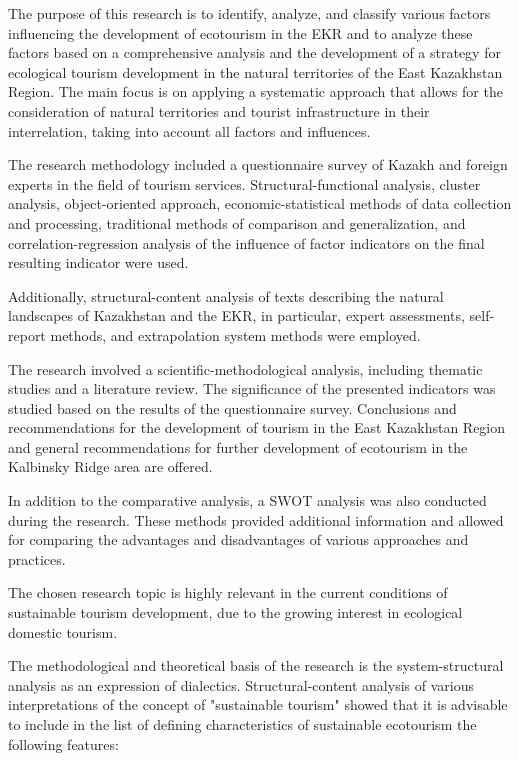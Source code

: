 \begin{multicols}{2}
The purpose of this research is to identify, analyze, and classify
various factors influencing the development of ecotourism in the EKR and
to analyze these factors based on a comprehensive analysis and the
development of a strategy for ecological tourism development in the
natural territories of the East Kazakhstan Region. The main focus is on
applying a systematic approach that allows for the consideration of
natural territories and tourist infrastructure in their interrelation,
taking into account all factors and influences.

The research methodology included a questionnaire survey of Kazakh and
foreign experts in the field of tourism services. Structural-functional
analysis, cluster analysis, object-oriented approach,
economic-statistical methods of data collection and processing,
traditional methods of comparison and generalization, and
correlation-regression analysis of the influence of factor indicators on
the final resulting indicator were used.

Additionally, structural-content analysis of texts describing the
natural landscapes of Kazakhstan and the EKR, in particular, expert
assessments, self-report methods, and extrapolation system methods were
employed.

The research involved a scientific-methodological analysis, including
thematic studies and a literature review. The significance of the
presented indicators was studied based on the results of the
questionnaire survey. Conclusions and recommendations for the
development of tourism in the East Kazakhstan Region and general
recommendations for further development of ecotourism in the Kalbinsky
Ridge area are offered.

In addition to the comparative analysis, a SWOT analysis was also
conducted during the research. These methods provided additional
information and allowed for comparing the advantages and disadvantages
of various approaches and practices.

The chosen research topic is highly relevant in the current conditions
of sustainable tourism development, due to the growing interest in
ecological domestic tourism.

The methodological and theoretical basis of the research is the
system-structural analysis as an expression of dialectics.
Structural-content analysis of various interpretations of the concept of
"sustainable tourism" showed that it is advisable to include in the list
of defining characteristics of sustainable ecotourism the following
features:


\end{multicols}
